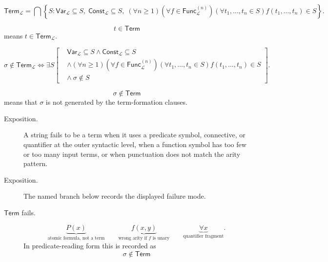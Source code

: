 \begin{remark*}
\[
\mathsf{Term}_{\mathcal L}
=
\bigcap
\left\{
S:
\mathsf{Var}_{\mathcal L}\subseteq S,\;
\mathsf{Const}_{\mathcal L}\subseteq S,\;
(\forall n\geq 1)(\forall f\in\mathsf{Func}_{\mathcal L}^{(n)})
(\forall t_1,\ldots,t_n\in S)
f(t_1,\ldots,t_n)\in S
\right\}.
\]
\end{remark*}

\begin{remark*}
\[
  t\in\mathsf{Term}
\] means \(t\in\mathsf{Term}_{\mathcal L}\).
\end{remark*}

\begin{remark*}
\[
\sigma\notin\mathsf{Term}_{\mathcal L}
\Longleftrightarrow
\exists S
\left[
\begin{aligned}
&\mathsf{Var}_{\mathcal L}\subseteq S
\land
\mathsf{Const}_{\mathcal L}\subseteq S\\
&\land
(\forall n\geq 1)(\forall f\in\mathsf{Func}_{\mathcal L}^{(n)})
(\forall t_1,\ldots,t_n\in S)
f(t_1,\ldots,t_n)\in S\\
&\land\ \sigma\notin S
\end{aligned}
\right].
\]
\end{remark*}

\begin{remark*}
\[
  \sigma\notin\mathsf{Term}
\] means that \(\sigma\) is not generated by
the term-formation clauses.
\end{remark*}

\begin{remark*}
\begin{description}
  \item[Exposition.] A string fails to be a term when it uses a predicate symbol, connective, or
quantifier at the outer syntactic level, when a function symbol has too few or
too many input terms, or when punctuation does not match the arity pattern.
\end{description}
\end{remark*}

\begin{remark*}
\begin{description}
  \item[Exposition.] The named branch below records the displayed failure mode.
\item[\(\mathsf{Term}\) fails.] \[
\underbrace{P(x)}_{\text{atomic formula, not a term}}
\qquad
\underbrace{f(x,y)}_{\text{wrong arity if }f\text{ is unary}}
\qquad
\underbrace{\forall x}_{\text{quantifier fragment}}.
\]
  In predicate-reading form this is recorded as
  \[
    \sigma\notin\mathsf{Term}
  \]
\end{description}
\end{remark*}

